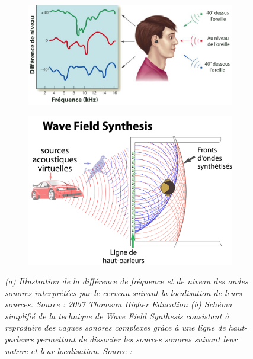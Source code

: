 \begin{figure}[h]
  \begin{subfigure}{.6\textwidth}
  \centering
  {\includegraphics[width=1\linewidth]{./figures/ch2/HRTF.png}}
    \caption{}
    \label{Fig:HRTF}
  \end{subfigure}
  \begin{subfigure}{.4\textwidth}
  \centering
  {\includegraphics[width=1\linewidth]{./figures/ch2/wfs_edit.png}}
    \caption{}
    \label{Fig:wfs_edit}
  \hspace{0.3cm}
  \end{subfigure}
  \caption[(a) Illustration de la différence de fréquence et de niveau des ondes sonores interprétées par le cerveau suivant la localisation de leurs sources. (b) Schéma simplifié de la technique de Wave Field Synthesis.]{\it (a) Illustration de la différence de fréquence et de niveau des ondes sonores interprétées par le cerveau suivant la localisation de leurs sources. Source : \textit{2007 Thomson Higher Education}
  (b) Schéma simplifié de la technique de Wave Field Synthesis consistant à reproduire des vagues sonores complexes grâce à une ligne de haut-parleurs permettant de dissocier les sources sonores suivant leur nature et leur localisation. Source : \cite{www.syntheticwave.de.dove_english:_2015}
  }
\end{figure}

